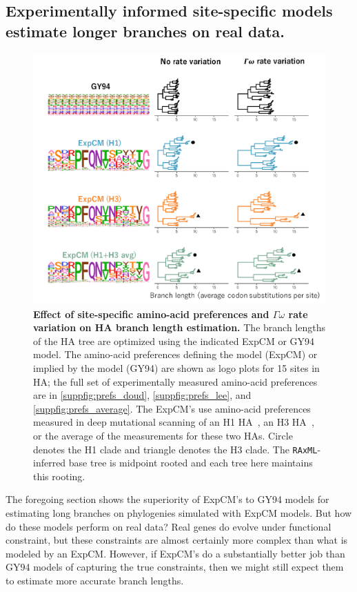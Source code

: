 \documentclass[11pt]{article}
\begin{document}
\subsection*{Experimentally informed site-specific models estimate longer branches on real data.}

\begin{figure}
\centerline{\includegraphics[width=\textwidth]{figures/empirical_trees.pdf}}
\caption{\label{fig:empirical_trees}
\textbf{Effect of site-specific amino-acid preferences and $\Gamma\omega$ rate variation on HA branch length estimation.} 
The branch lengths of the HA tree are optimized using the indicated ExpCM or GY94 model. 
The amino-acid preferences defining the model (ExpCM) or implied by the model (GY94) are shown as logo plots for 15 sites in HA; the full set of experimentally measured amino-acid preferences are in \ref{suppfig:prefs_doud}, \ref{suppfig:prefs_lee}, and \ref{suppfig:prefs_average}. 
The ExpCM's use amino-acid preferences measured in deep mutational scanning of an H1 HA~\citep{doud2016accurate}, an H3 HA~\citep{lee2018deep}, or the average of the measurements for these two HAs.
Circle denotes the H1 clade and triangle denotes the H3 clade.
The \texttt{RAxML}-inferred base tree is midpoint rooted and each tree here maintains this rooting.
}
\end{figure}

The foregoing section shows the superiority of ExpCM's to GY94 models for estimating long branches on phylogenies simulated with ExpCM models.
But how do these models perform on real data?
Real genes do evolve under functional constraint, but these constraints are almost certainly more complex than what is modeled by an ExpCM.
However, if ExpCM's do a substantially better job than GY94 models of capturing the true constraints, then we might still expect them to estimate more accurate branch lengths.
\end{document}
